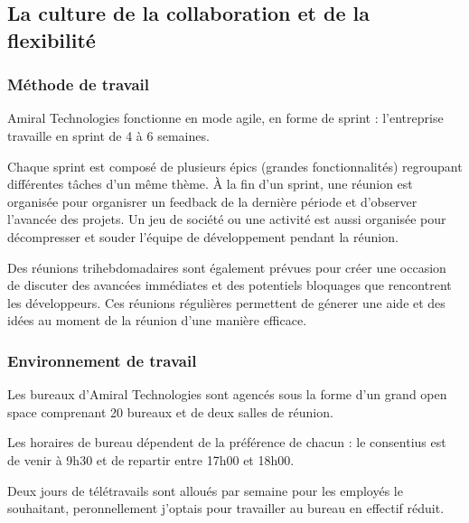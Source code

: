 \subsection{La culture de la collaboration et de la flexibilité}
\subsubsection{Méthode de travail}
Amiral Technologies fonctionne en mode agile, en forme de sprint : l’entreprise travaille en sprint de 4 à 6 semaines.

Chaque sprint est composé de plusieurs épics (grandes fonctionnalités) regroupant différentes tâches d'un même thème.
À la fin d’un sprint, une réunion est organisée pour organisrer un feedback de la dernière période et d'observer l'avancée des projets.
Un jeu de société ou une activité est aussi organisée pour décompresser et souder l'équipe de développement pendant la réunion.

Des réunions trihebdomadaires sont également prévues pour créer une occasion de discuter des avancées immédiates et des potentiels bloquages que rencontrent les développeurs.
Ces réunions régulières permettent de génerer une aide et des idées au moment de la réunion d'une manière efficace.

\subsubsection{Environnement de travail}
Les bureaux d'Amiral Technologies sont agencés sous la forme d'un grand open space comprenant 20 bureaux et de deux salles de réunion.

Les horaires de bureau dépendent de la préférence de chacun : le consentius est de venir à 9h30 et de repartir entre 17h00 et 18h00.

Deux jours de télétravails sont alloués par semaine pour les employés le souhaitant, peronnellement j'optais pour travailler au bureau en effectif réduit.